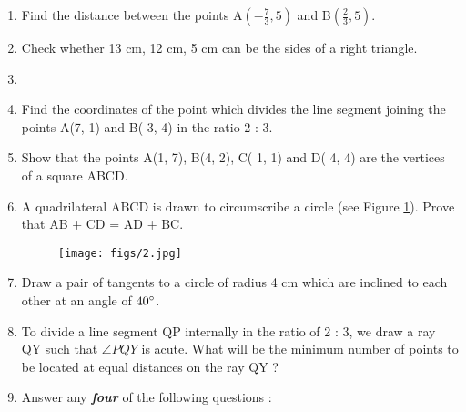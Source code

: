 \documentclass{exam}
\begin{document}
\begin{enumerate}
		
		\item Find the distance between the points A$(-\frac{7}{3},5)$ and B$(\frac{2}{3},5)$.
		
		\item Check whether 13 cm, 12 cm, 5 cm can be the sides of a right triangle.
		
		\item
		
		\item Find the coordinates of the point which divides the line segment joining the points A(7, 1) and B( 3, 4) in the ratio 2 : 3. 
		
		\item Show that the points A(1, 7), B(4, 2), C( 1, 1) and D( 4, 4) are the vertices of a square ABCD. 
		
		\item A quadrilateral ABCD is drawn to circumscribe a circle (see Figure \ref{fig:leaf}). Prove that AB + CD = AD + BC.

		\begin{figure}[h]
        \centering
        \texttt{[image: figs/2.jpg]}
        \caption{}
        \label{fig:leaf}
        \end{figure}
            
		\item Draw a pair of tangents to a circle of radius 4 cm which are inclined to each other at an angle of $40\degree$. 
		
		\item To divide a line segment QP internally in the ratio of 2 : 3, we draw a ray QY such that $\angle PQY$ is acute. What will be the minimum number of points to be located at equal distances on the ray QY ? 
		
		\item Answer any \textbf{\textit{four}} of the following questions : 
		

\end{enumerate}
\end{document}
